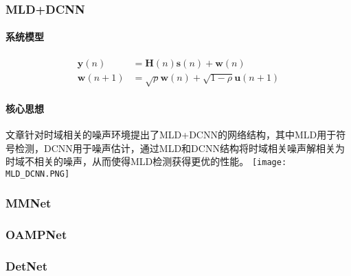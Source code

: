 \subsubsection{MLD+DCNN\cite{2020A}}
\paragraph{系统模型}
\begin{equation}
    \begin{aligned}
    \bm{y}(n)&=\bm{H}(n)\bm{s}(n)+\bm{w}(n) \\ 
    \bm{w}(n+1)&=\sqrt{\rho}\bm{w}(n)+\sqrt{1-\rho}\bm{u}(n+1)
    \end{aligned}
\end{equation}
\paragraph{核心思想} 
文章针对时域相关的噪声环境提出了MLD+DCNN的网络结构，其中MLD用于符号检测，DCNN用于噪声估计，通过MLD和DCNN结构将时域相关噪声解相关为时域不相关的噪声，从而使得MLD检测获得更优的性能。
\texttt{[image: MLD\_DCNN.PNG]}

\subsubsection{MMNet}
\subsubsection{OAMPNet}
\subsubsection{DetNet}

